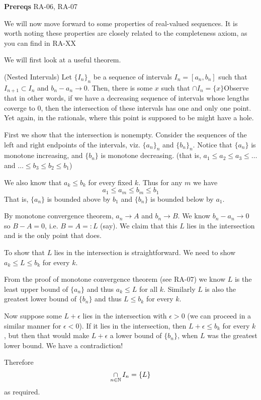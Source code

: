 

\textbf{Prereqs} RA-06, RA-07

We will now move forward to some properties of real-valued sequences. It is worth noting these properties are closely related to the completeness axiom, as you can find in RA-XX

We will first look at a useful theorem.
\begin{SWP}{\thm}{(Nested Intervals) Let $\{I_n\}_n$ be a sequence of intervals $I_n = [a_n, b_n]$ such that $I_{n + 1} \subset I_{n}$ and $b_n - a_n \rightarrow 0$. Then, there is some $x$ such that $\cap I_n = \{x\}$}Observe that in other words, if we have a decreasing sequence of intervals whose lengths coverge to $0$, then the intersection of these intervals has one and only one point. Yet again, in the rationals, where this point is supposed to be might have a hole.

First we show that the intersection is nonempty. Consider the sequences of the left and right endpoints of the intervals, viz. $\{a_n\}_n$ and $\{b_n\}_n$. Notice that $\{a_n\}$ is monotone increasing, and $\{b_n\}$ is monotone decreasing. (that is, $a_1 \leq a_2 \leq a_3 \leq \dots$ and $\dots \leq b_3 \leq b_2 \leq b_1$)  

We also know that $a_k \leq b_k$ for every fixed $k$. Thus for any $m$ we have
$$
a_1 \leq a_m \leq b_m \leq b_1
$$
That is, $\{a_n\}$ is bounded above by $b_1$ and $\{b_n\}$ is bounded below by $a_1$.

By monotone convergence theorem, $a_n \rightarrow A$ and $b_n \rightarrow B$. We know $b_n - a_n \rightarrow 0$ so $B - A = 0$, i.e. $B = A =: L$ (say). We claim that this $L$ lies in the intersection and is the only point that does.

To show that $L$ lies in the intersection is straightforward. We need to show $a_k \leq L \leq b_k$ for every $k$.

From the proof of monotone convergence theorem (see RA-07) we know $L$ is the least upper bound of $\{a_n\}$ and thus $a_k \leq L$ for all $k$. Similarly $L$ is also the greatest lower bound of $\{b_n\}$ and thus $L \leq b_k$ for every $k$.

Now suppose some $L + \epsilon$ lies in the intersection with $\epsilon > 0$ (we can proceed in a similar manner for $\epsilon < 0$). If it lies in the intersection, then $L + \epsilon \leq b_k$ for every $k$, but then that would make $L + \epsilon$ a lower bound of $\{b_n\}$, when $L$ was the greatest lower bound. We have a contradiction!\contra

Therefore$$\displaystyle\mathop{\cap}\limits_{n \in \mathbb{N}}I_n = \{L\}$$as required.
\end{SWP}

